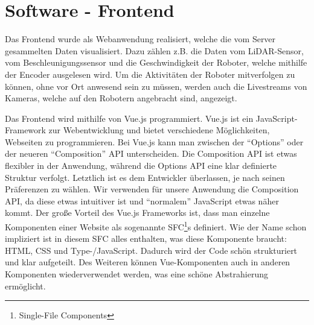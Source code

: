 
\section{Software - Frontend}
\label{sec:software_frontend}
Das Frontend wurde als Webanwendung realisiert,
welche die vom Server gesammelten Daten visualisiert.
%
Dazu zählen z.B. die Daten vom LiDAR-Sensor,
vom Beschleunigungssensor
und die Geschwindigkeit der Roboter,
welche mithilfe der Encoder ausgelesen wird.
%
Um die Aktivitäten der Roboter mitverfolgen zu können,
ohne vor Ort anwesend sein zu müssen,
werden auch die Livestreams von Kameras,
welche auf den Robotern angebracht sind,
angezeigt.

Das Frontend wird mithilfe von Vue.js programmiert.
%
Vue.js ist ein JavaScript-Framework zur Webentwicklung
und bietet verschiedene Möglichkeiten,
Webseiten zu programmieren.
%
Bei Vue.js kann man zwischen der ``Options'' oder
der neueren ``Composition'' API unterscheiden.
%
Die Composition API ist etwas flexibler in der Anwendung,
während die Options API eine klar definierte Struktur verfolgt.
%
Letztlich ist es dem Entwickler überlassen,
je nach seinen Präferenzen zu wählen.
%
Wir verwenden für unsere Anwendung die Composition API,
da diese etwas intuitiver ist
und ``normalem'' JavaScript etwas näher kommt. 
%
Der große Vorteil des Vue.js Frameworks ist,
dass man einzelne Komponenten einer Website
als sogenannte SFC\footnote{Single-File Components}s definiert.
%
Wie der Name schon impliziert ist in diesem SFC alles enthalten,
was diese Komponente braucht: HTML, CSS und Type-/JavaScript.
%
Dadurch wird der Code schön strukturiert und klar aufgeteilt.
%
Des Weiteren können Vue-Komponenten auch
in anderen Komponenten wiederverwendet werden,
was eine schöne Abstrahierung ermöglicht.


